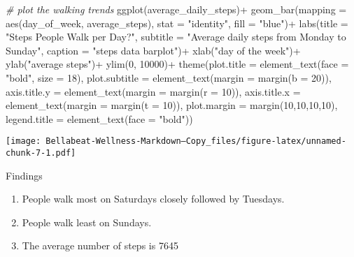 \documentclass[
]{article}
\newenvironment{Shaded}{\begin{snugshade}}{\end{snugshade}}
\newcommand{\AttributeTok}[1]{\textcolor[rgb]{0.77,0.63,0.00}{#1}}
\newcommand{\CommentTok}[1]{\textcolor[rgb]{0.56,0.35,0.01}{\textit{#1}}}
\newcommand{\DecValTok}[1]{\textcolor[rgb]{0.00,0.00,0.81}{#1}}
\newcommand{\FunctionTok}[1]{\textcolor[rgb]{0.00,0.00,0.00}{#1}}
\newcommand{\NormalTok}[1]{#1}
\newcommand{\SpecialCharTok}[1]{\textcolor[rgb]{0.00,0.00,0.00}{#1}}
\newcommand{\StringTok}[1]{\textcolor[rgb]{0.31,0.60,0.02}{#1}}
\begin{document}
\begin{Shaded}
\begin{Highlighting}[]
\CommentTok{\# plot the walking trends}
\FunctionTok{ggplot}\NormalTok{(average\_daily\_steps)}\SpecialCharTok{+}
  \FunctionTok{geom\_bar}\NormalTok{(}\AttributeTok{mapping =} \FunctionTok{aes}\NormalTok{(day\_of\_week, average\_steps), }\AttributeTok{stat =} \StringTok{"identity"}\NormalTok{, }
           \AttributeTok{fill =} \StringTok{"blue"}\NormalTok{)}\SpecialCharTok{+}
  \FunctionTok{labs}\NormalTok{(}\AttributeTok{title =} \StringTok{"Steps People Walk per Day?"}\NormalTok{, }
       \AttributeTok{subtitle =} \StringTok{"Average daily steps from Monday to Sunday"}\NormalTok{,}
       \AttributeTok{caption =} \StringTok{"steps data barplot"}\NormalTok{)}\SpecialCharTok{+}
  \FunctionTok{xlab}\NormalTok{(}\StringTok{"day of the week"}\NormalTok{)}\SpecialCharTok{+}
  \FunctionTok{ylab}\NormalTok{(}\StringTok{"average steps"}\NormalTok{)}\SpecialCharTok{+}
  \FunctionTok{ylim}\NormalTok{(}\DecValTok{0}\NormalTok{, }\DecValTok{10000}\NormalTok{)}\SpecialCharTok{+}
  \FunctionTok{theme}\NormalTok{(}\AttributeTok{plot.title =} \FunctionTok{element\_text}\NormalTok{(}\AttributeTok{face =} \StringTok{"bold"}\NormalTok{, }\AttributeTok{size =} \DecValTok{18}\NormalTok{),}
        \AttributeTok{plot.subtitle =} \FunctionTok{element\_text}\NormalTok{(}\AttributeTok{margin =} \FunctionTok{margin}\NormalTok{(}\AttributeTok{b =} \DecValTok{20}\NormalTok{)),}
        \AttributeTok{axis.title.y =} \FunctionTok{element\_text}\NormalTok{(}\AttributeTok{margin =} \FunctionTok{margin}\NormalTok{(}\AttributeTok{r =} \DecValTok{10}\NormalTok{)),}
        \AttributeTok{axis.title.x =} \FunctionTok{element\_text}\NormalTok{(}\AttributeTok{margin =} \FunctionTok{margin}\NormalTok{(}\AttributeTok{t =} \DecValTok{10}\NormalTok{)),}
        \AttributeTok{plot.margin =} \FunctionTok{margin}\NormalTok{(}\DecValTok{10}\NormalTok{,}\DecValTok{10}\NormalTok{,}\DecValTok{10}\NormalTok{,}\DecValTok{10}\NormalTok{),}
        \AttributeTok{legend.title =} \FunctionTok{element\_text}\NormalTok{(}\AttributeTok{face =} \StringTok{"bold"}\NormalTok{))}
\end{Highlighting}
\end{Shaded}

\texttt{[image: Bellabeat-Wellness-Markdown---Copy\_files/figure-latex/unnamed-chunk-7-1.pdf]}

Findings

\begin{enumerate}
\def\labelenumi{\arabic{enumi}.}
\item
  People walk most on Saturdays closely followed by Tuesdays.
\item
  People walk least on Sundays.
\item
  The average number of steps is 7645
\end{enumerate}
\end{document}
